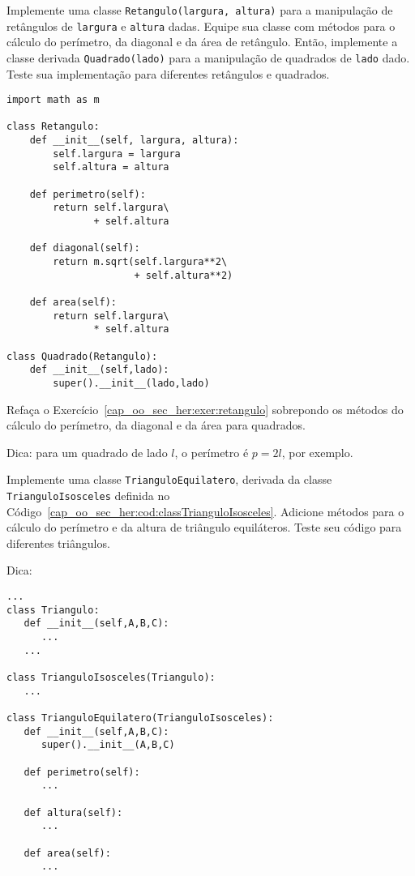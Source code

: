 \begin{exer}\label{cap_oo_sec_her:exer:retangulo}
  Implemente uma classe \lstinline+Retangulo(largura, altura)+ para a manipulação de retângulos de \lstinline+largura+ e \lstinline+altura+ dadas. Equipe sua classe com métodos para o cálculo do perímetro, da diagonal e da área de retângulo. Então, implemente a classe derivada \lstinline+Quadrado(lado)+ para a manipulação de quadrados de \lstinline+lado+ dado. Teste sua implementação para diferentes retângulos e quadrados.
\end{exer}
\begin{resp}
\begin{lstlisting}
import math as m

class Retangulo:
    def __init__(self, largura, altura):
        self.largura = largura
        self.altura = altura

    def perimetro(self):
        return self.largura\
               + self.altura

    def diagonal(self):
        return m.sqrt(self.largura**2\
                      + self.altura**2)

    def area(self):
        return self.largura\
               * self.altura

class Quadrado(Retangulo):
    def __init__(self,lado):
        super().__init__(lado,lado)
\end{lstlisting}
\end{resp}

\begin{exer}
  Refaça o Exercício~\ref{cap_oo_sec_her:exer:retangulo} sobrepondo os métodos do cálculo do perímetro, da diagonal e da área para quadrados.
\end{exer}
\begin{resp}
  Dica: para um quadrado de lado $l$, o perímetro é $p = 2l$, por exemplo.
\end{resp}

\begin{exer}
  Implemente uma classe \lstinline+TrianguloEquilatero+, derivada da classe \lstinline+TrianguloIsosceles+ definida no Código~\ref{cap_oo_sec_her:cod:classTrianguloIsosceles}. Adicione métodos para o cálculo do perímetro e da altura de triângulo equiláteros. Teste seu código para diferentes triângulos.
\end{exer}
\begin{resp}
  Dica:
\begin{lstlisting}
...
class Triangulo:
   def __init__(self,A,B,C):
      ...
   ...

class TrianguloIsosceles(Triangulo):
   ...

class TrianguloEquilatero(TrianguloIsosceles):
   def __init__(self,A,B,C):
      super().__init__(A,B,C)

   def perimetro(self):
      ...

   def altura(self):
      ...
   
   def area(self):
      ...
\end{lstlisting}
\end{resp}


